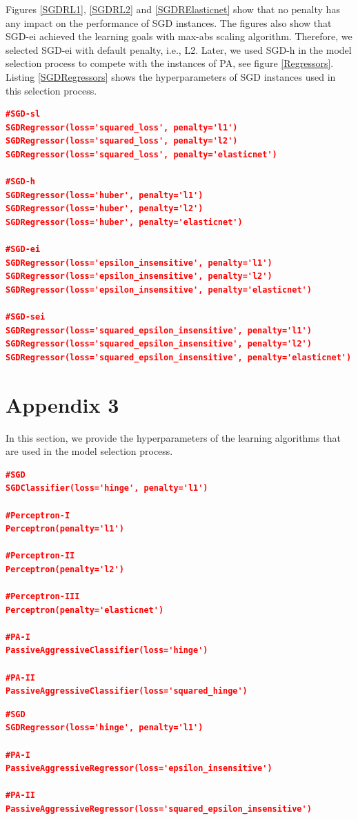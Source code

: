 \documentclass[a4paper,12pt]{article}
\begin{document}
Figures \ref{SGDRL1}, \ref{SGDRL2} and \ref{SGDRElasticnet} show that no penalty has any impact on the performance of SGD instances. The figures also show that SGD-ei achieved the learning goals with max-abs scaling algorithm. Therefore, we selected SGD-ei with default penalty, i.e., L2. Later, we used SGD-h in the model selection process to compete with the instances of PA, see figure \ref{Regressors}. Listing \ref{SGDRegressors} shows the hyperparameters of SGD instances used in this selection process.
\begin{lstlisting}[language=json, caption=Hyperparameters of SGD instances for regression approach, label=SGDRegressors]
#SGD-sl
SGDRegressor(loss='squared_loss', penalty='l1')
SGDRegressor(loss='squared_loss', penalty='l2')
SGDRegressor(loss='squared_loss', penalty='elasticnet')

#SGD-h
SGDRegressor(loss='huber', penalty='l1')
SGDRegressor(loss='huber', penalty='l2')
SGDRegressor(loss='huber', penalty='elasticnet')

#SGD-ei
SGDRegressor(loss='epsilon_insensitive', penalty='l1')
SGDRegressor(loss='epsilon_insensitive', penalty='l2')
SGDRegressor(loss='epsilon_insensitive', penalty='elasticnet')

#SGD-sei
SGDRegressor(loss='squared_epsilon_insensitive', penalty='l1')
SGDRegressor(loss='squared_epsilon_insensitive', penalty='l2')
SGDRegressor(loss='squared_epsilon_insensitive', penalty='elasticnet')
\end{lstlisting}
\newpage
\section{Appendix 3} \label{Hyperparameters}
In this section, we provide the hyperparameters of the learning algorithms that are used in the model selection process.
\begin{lstlisting}[language=json, caption=Hyperparameters of the learning algorithms for classification approach, label=ClassifiersSettings]
#SGD
SGDClassifier(loss='hinge', penalty='l1')

#Perceptron-I
Perceptron(penalty='l1')

#Perceptron-II
Perceptron(penalty='l2')

#Perceptron-III
Perceptron(penalty='elasticnet')

#PA-I
PassiveAggressiveClassifier(loss='hinge')

#PA-II
PassiveAggressiveClassifier(loss='squared_hinge')
\end{lstlisting}
\begin{lstlisting}[language=json, caption=Hyperparameters of the learning algorithms for regression approach, label=RegressorsSettings]
#SGD
SGDRegressor(loss='hinge', penalty='l1')

#PA-I
PassiveAggressiveRegressor(loss='epsilon_insensitive')

#PA-II
PassiveAggressiveRegressor(loss='squared_epsilon_insensitive')
\end{lstlisting}
\end{document}
